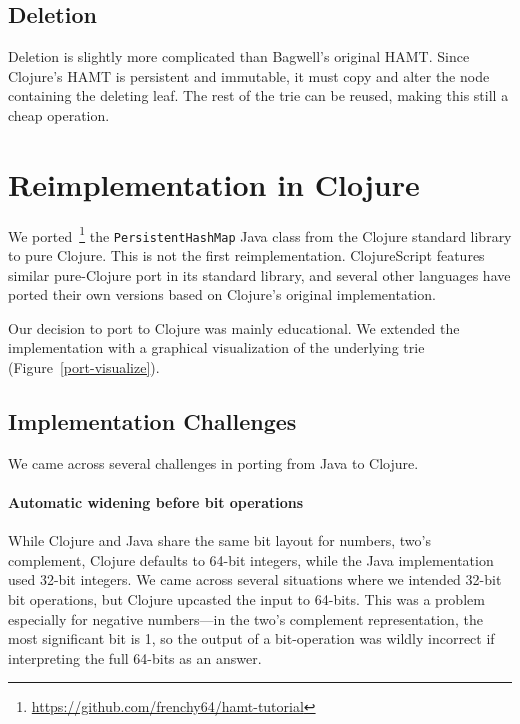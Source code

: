 \documentclass[preprint]{sigplanconf}
\begin{document}
\subsection{Deletion}
Deletion is slightly more complicated than Bagwell's original
HAMT. Since Clojure's HAMT is persistent and immutable, it
must copy and alter the node containing the deleting leaf.
The rest of the trie can be reused, making this still a cheap
operation.

\section{Reimplementation in Clojure}

We ported~\footnote{\url{https://github.com/frenchy64/hamt-tutorial}}
the \texttt{PersistentHashMap} Java class from
the Clojure standard library to pure Clojure.
This is not the first reimplementation. ClojureScript
features similar pure-Clojure port in its standard library,
and several other languages have ported their own versions
based on Clojure's original implementation.

Our decision to port to Clojure was mainly educational.
We extended the implementation with a graphical visualization
of the underlying trie
(Figure~\ref{port-visualize}).

\subsection{Implementation Challenges}

We came across several challenges in porting from Java to
Clojure.

\paragraph{Automatic widening before bit operations}
While Clojure and Java share the same bit layout
for numbers, two's complement, Clojure
defaults to 64-bit integers, while the Java
implementation used 32-bit integers.
%
We came across several situations
where we intended 32-bit bit operations, but
Clojure upcasted the input to 64-bits. This
was a problem especially for negative numbers---in
the two's complement representation, the most
significant bit is 1, so the output of a bit-operation
was wildly incorrect if interpreting the full
64-bits as an answer.

%
\end{document}
